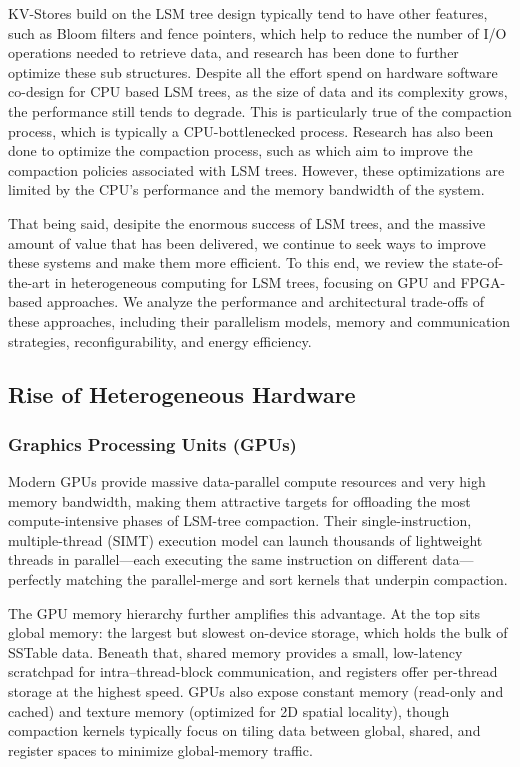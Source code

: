 \documentclass[sigconf]{acmart}
\begin{document}
    KV-Stores build on the LSM tree design typically tend to have other features, such as Bloom filters and fence pointers, which help to reduce the number of I/O operations needed to retrieve data, and research has been done to further optimize these sub structures.\cite{dayan2017monkey}
    Despite all the effort spend on hardware software co-design for CPU based LSM trees, as the size of data and its complexity grows, the performance still tends to degrade. This is particularly true of the compaction process, which is typically a CPU-bottlenecked process. 
    Research has also been done to optimize the compaction process, such as \cite{dayan2018dostoevsky} \cite{dayan2019log} which aim to improve the compaction policies associated with LSM trees. However, these optimizations are limited by the CPU's performance and the memory bandwidth of the system.
    
    That being said, desipite the enormous success of LSM trees, and the massive amount of value that has been delivered, we continue to seek ways to improve these systems and make them more efficient. To this end, we review the state-of-the-art in heterogeneous computing for LSM trees, focusing on GPU and FPGA-based approaches. We analyze the performance and architectural trade-offs of these approaches, including their parallelism models, memory and communication strategies, reconfigurability, and energy efficiency.

  \subsection{Rise of Heterogeneous Hardware}

  \subsubsection{Graphics Processing Units (GPUs)}
  Modern GPUs provide massive data-parallel compute resources and very high memory bandwidth, making them attractive targets for offloading the most compute‐intensive phases of LSM-tree compaction.  
  Their single-instruction, multiple-thread (SIMT) execution model can launch thousands of lightweight threads in parallel—each executing the same instruction on different data—perfectly matching the parallel‐merge and sort kernels that underpin compaction.

  The GPU memory hierarchy further amplifies this advantage.  At the top sits global memory: the largest but slowest on-device storage, which holds the bulk of SSTable data.  
  Beneath that, shared memory provides a small, low-latency scratchpad for intra–thread-block communication, and registers offer per-thread storage at the highest speed.  
  GPUs also expose constant memory (read-only and cached) and texture memory (optimized for 2D spatial locality), though compaction kernels typically focus on tiling data between global, shared, and register spaces to minimize global-memory traffic.
\end{document}
